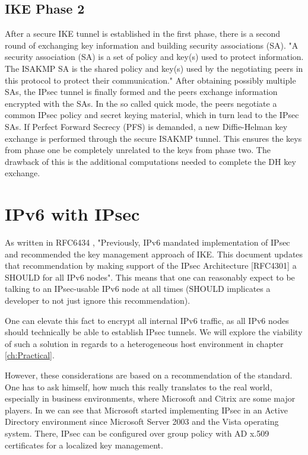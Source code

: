 \documentclass[a4paper]{report}
\begin{document}
\subsection{IKE Phase 2}
\label{ssec:Phase2}
After a secure IKE tunnel is established in the first phase, there is a second round of exchanging key information and building security associations (SA). "A security association (SA) is a set of policy and key(s) used to protect information. The ISAKMP SA is the shared policy and key(s) used by the negotiating peers in this protocol to protect their communication." \parencite{Harkins1998} After obtaining possibly multiple SAs, the IPsec tunnel is finally formed and the peers exchange information encrypted with the SAs. In the so called quick mode, the peers negotiate a common IPsec policy and secret keying material, which in turn lead to the IPsec SAs. If Perfect Forward Secrecy (PFS) is demanded, a new Diffie-Helman key exchange is performed through the secure ISAKMP tunnel. This ensures the keys from phase one be completely unrelated to the keys from phase two. The drawback of this is the additional computations needed to complete the DH key exchange.

\section{IPv6 with IPsec}
\label{sec:IPv6IPsec}

As written in RFC6434 \parencite{Jankiewicz2011}, "Previously, IPv6 mandated implementation of IPsec and recommended the key management approach of IKE. This document updates that recommendation by making support of the IPsec Architecture [RFC4301] a SHOULD for all IPv6 nodes". This means that one can reasonably expect to be talking to an IPsec-usable IPv6 node at all times (SHOULD implicates a developer to not just ignore this recommendation).

One can elevate this fact to encrypt all internal IPv6 traffic, as all IPv6 nodes should technically be able to establish IPsec tunnels. We will explore the viability of such a solution in regards to a heterogeneous host environment in chapter \ref{ch:Practical}.

However, these considerations are based on a recommendation of the standard. One has to ask himself, how much this really translates to the real world, especially in business environments, where Microsoft and Citrix are some major players.
In \cite{MicrosoftTechnet2003} we can see that Microsoft started implementing IPsec in an Active Directory environment since Microsoft Server 2003 and the Vista operating system. There, IPsec can be configured over group policy with AD x.509 certificates for a localized key management.
\end{document}
